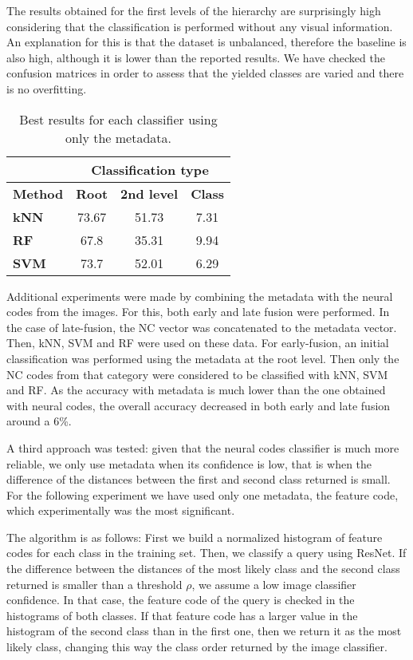 \documentclass[final, twocolumn]{elsarticle}
\begin{document}
The results obtained for the first levels of the hierarchy are surprisingly high considering that the classification is performed without any visual information. An explanation for this is that the dataset is unbalanced, therefore the baseline is also high, although it is lower than the reported results. We have checked the confusion matrices in order to assess that the yielded classes are varied and there is no overfitting.


\begin{table}
\centering
\footnotesize
\begin{tabular}{lccc}
\hline
                & \multicolumn{3}{c}{\textbf{Classification type}}    \\ \hline
\textbf{Method} & \textbf{Root} & \textbf{2nd level} & \textbf{Class} \\ \hline
\textbf{kNN}    & 73.67         & 51.73              & 7.31           \\
\textbf{RF}     & 67.8          & 35.31              & 9.94           \\
\textbf{SVM}    & 73.7          & 52.01              & 6.29           \\ \hline
\end{tabular}
\caption{Best results for each classifier using only the metadata.}
\label{tab:metadata-results}
\end{table}


Additional experiments were made by combining the  metadata with the neural codes from the images. For this, both early and late fusion were performed. In the case of late-fusion, the NC vector was concatenated to the metadata vector. Then, kNN, SVM and RF were used on these data. For early-fusion, an initial classification was performed using the metadata at the root level. Then only the NC codes from that category were considered to be classified  with kNN, SVM and RF. As the accuracy with metadata is much lower than the one obtained with neural codes, the overall accuracy decreased in both early and late fusion around a 6\%.

A third approach was tested: given that the neural codes classifier is much more reliable, we only use metadata when its confidence is low, that is when the difference of the distances between the first and second class returned is small. For the following experiment we have used only one metadata, the feature code, which experimentally was the most significant. 

The algorithm is as follows: First we build a normalized histogram of feature codes for each class in the training set. Then, we classify a query using ResNet. If the difference between the distances of the most likely class and the second class returned is smaller than a threshold $\rho$, we assume a low image classifier confidence. In that case, the feature code of the query is checked in the histograms of both classes. If that feature code has a larger value in the histogram of the second class than in the first one, then we return it as the most likely class, changing this way the class order returned by the image classifier.
\end{document}
